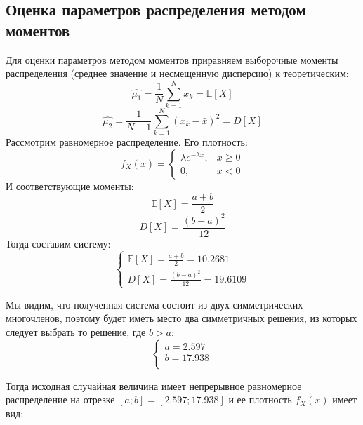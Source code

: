\documentclass[14pt,a4paper]{scrartcl}
\begin{document}
\subsection{Оценка параметров распределения методом моментов}
Для оценки параметров методом моментов приравняем выборочные моменты распределения (среднее значение и несмещенную дисперсию) к теоретическим:
\begin{equation*}
	\hat{\mu_1} = \frac{1}{N}\sum_{k=1}^{N}x_k = \mathbb{E}[X]
\end{equation*}
\begin{equation*}
	\hat{\mu_2} = \frac{1}{N-1}\sum_{k=1}^{N}(x_k-\bar{x})^2 = D[X]
\end{equation*}
Рассмотрим равномерное распределение. Его плотность:
\begin{equation*}
	f_{X}(x)=\left\{\begin{array}{ll}{\lambda e^{-\lambda x},} & {x \geq 0} \\ {0,} & {x<0}\end{array}\right.
\end{equation*}
И соответствующие моменты:
\begin{equation*}
	\mathbb{E}[X] = \frac{a+b}{2}
\end{equation*}
\begin{equation*}
	D[X] = \frac{(b-a)^2}{12}
\end{equation*}
Тогда составим систему: \\
\begin{equation*}
	\begin{cases*}
		\mathbb{E}[X] = \frac{a+b}{2} = 10.2681 \\
		D[X] = \frac{(b-a)^2}{12} = 19.6109
	\end{cases*}
\end{equation*}

Мы видим, что полученная система состоит из двух симметрических многочленов, поэтому будет иметь место два симметричных решения, из которых следует выбрать то решение, где $b > a$: \\
\begin{equation*}
	\begin{cases*}
		a=2.597 \\
		b=17.938 \\
	\end{cases*}
\end{equation*}

Тогда исходная случайная величина имеет непрерывное равномерное распределение на отрезке $[a;b] = [2.597; 17.938]$ и ее плотность $f_X(x)$ имеет вид:
\end{document}
